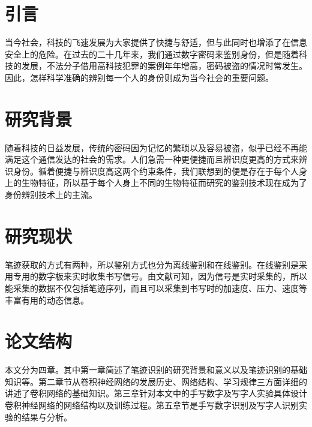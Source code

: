 
\label{cha:introduction}
\section{引言}
\label{sec:background}
当今社会，科技的飞速发展为大家提供了快捷与舒适，但与此同时也增添了在信息安全上的危险。在过去的二十几年来，我们通过数字密码来鉴别身份，但是随着科技的发展，不法分子借用高科技犯罪的案例年年增高，密码被盗的情况时常发生。因此，怎样科学准确的辨别每一个人的身份则成为当今社会的重要问题。
\section{研究背景}
\label{sec:related_work}
随着科技的日益发展，传统的密码因为记忆的繁琐以及容易被盗，似乎已经不再能满足这个通信发达的社会的需求。人们急需一种更便捷而且辨识度更高的方式来辨识身份。循着便捷与辨识度高这两个约束条件，我们联想到的便是存在于每个人身上的生物特征，所以基于每个人身上不同的生物特征而研究的鉴别技术现在成为了身份辨别技术上的主流。

\section{研究现状}
笔迹获取的方式有两种，所以鉴别方式也分为离线鉴别和在线鉴别。在线鉴别是采用专用的数字板来实时收集书写信号。由文献\cite{ref4,ref5,ref6,ref7}可知，因为信号是实时采集的，所以能采集的数据不仅包括笔迹序列，而且可以采集到书写时的加速度、压力、速度等丰富有用的动态信息。

\section{论文结构}
本文分为四章。其中第一章简述了笔迹识别的研究背景和意义以及笔迹识别的基础知识等。第二章节从卷积神经网络的发展历史、网络结构、学习规律三方面详细的讲述了卷积网络的基础知识。第三章针对本文中的手写数字及写字人实验具体设计卷积神经网络的网络结构以及训练过程。第五章节是手写数字识别及写字人识别实验的结果与分析。